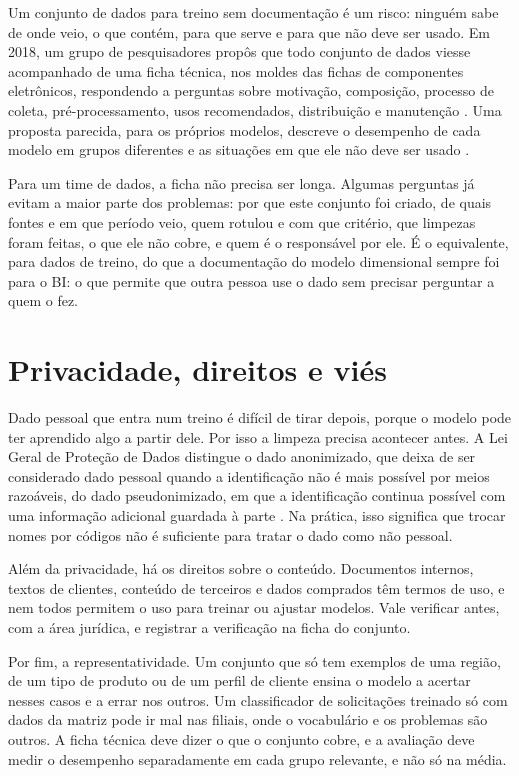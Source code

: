 Um conjunto de dados para treino sem documentação é um risco: ninguém sabe de onde veio, o
que contém, para que serve e para que não deve ser usado. Em 2018, um grupo de
pesquisadores propôs que todo conjunto de dados viesse acompanhado de uma ficha técnica, nos
moldes das fichas de componentes eletrônicos, respondendo a perguntas sobre motivação,
composição, processo de coleta, pré-processamento, usos recomendados, distribuição e
manutenção \parencite{gebru2021}. Uma proposta parecida, para os próprios modelos, descreve
o desempenho de cada modelo em grupos diferentes e as situações em que ele não deve ser
usado \parencite{mitchell2019}.

Para um time de dados, a ficha não precisa ser longa. Algumas perguntas já evitam a maior
parte dos problemas: por que este conjunto foi criado, de quais fontes e em que período veio,
quem rotulou e com que critério, que limpezas foram feitas, o que ele não cobre, e quem é o
responsável por ele. É o equivalente, para dados de treino, do que a documentação do modelo
dimensional sempre foi para o BI: o que permite que outra pessoa use o dado sem precisar
perguntar a quem o fez.

\section{Privacidade, direitos e viés}
\label{sec:privacidade-vies}

Dado pessoal que entra num treino é difícil de tirar depois, porque o modelo pode ter
aprendido algo a partir dele. Por isso a limpeza precisa acontecer antes. A Lei Geral de
Proteção de Dados distingue o dado anonimizado, que deixa de ser considerado dado pessoal
quando a identificação não é mais possível por meios razoáveis, do dado pseudonimizado, em
que a identificação continua possível com uma informação adicional guardada à parte
\parencite{lgpd2018}. Na prática, isso significa que trocar nomes por códigos não é
suficiente para tratar o dado como não pessoal. 

Além da privacidade, há os direitos sobre o conteúdo. Documentos internos, textos de
clientes, conteúdo de terceiros e dados comprados têm termos de uso, e nem todos permitem o
uso para treinar ou ajustar modelos. Vale verificar antes, com a área jurídica, e registrar a
verificação na ficha do conjunto.

Por fim, a representatividade. Um conjunto que só tem exemplos de uma região, de um tipo de
produto ou de um perfil de cliente ensina o modelo a acertar nesses casos e a errar nos
outros. Um classificador de solicitações treinado só com dados da matriz pode ir mal nas
filiais, onde o vocabulário e os problemas são outros. A ficha técnica deve dizer o que o
conjunto cobre, e a avaliação deve medir o desempenho separadamente em cada grupo relevante,
e não só na média.

